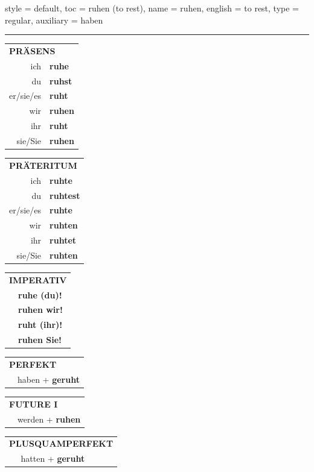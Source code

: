 \begin{verbentry}{
  style = {default},
  toc = {ruhen (to rest)},
  name = {ruhen},
  english = {to rest},
  type = {regular},
  auxiliary = {haben}
}
 

\vspace{5pt}
\hrule
\vspace{5pt}

\begin{tabular}{rl}
\multicolumn{2}{l}{\textbf{PRÄSENS}}\\
ich & \textbf{ruhe}\\
du & \textbf{ruhst}\\
er/sie/es & \textbf{ruht}\\
wir & \textbf{ruhen}\\
ihr & \textbf{ruht}\\
sie/Sie & \textbf{ruhen}\\
\end{tabular}
\hfill
\begin{tabular}{rl}
\multicolumn{2}{l}{\textbf{PRÄTERITUM}}\\
ich & \textbf{ruhte}\\
du & \textbf{ruhtest}\\
er/sie/es & \textbf{ruhte}\\
wir & \textbf{ruhten}\\
ihr & \textbf{ruhtet}\\
sie/Sie & \textbf{ruhten}\\
\end{tabular}
\hfill
\begin{tabular}{rl}
\multicolumn{2}{l}{\textbf{IMPERATIV}}\\
& \textbf{ruhe (du)!}\\
& \textbf{ruhen wir!}\\
& \textbf{ruht (ihr)!}\\
& \textbf{ruhen Sie!}\\
\end{tabular}

\vspace{10pt}

\begin{tabular}{rl}
\multicolumn{2}{l}{\textbf{PERFEKT}}\\
& haben + \textbf{geruht}\\
\end{tabular}
\hfill
\begin{tabular}{rl}
\multicolumn{2}{l}{\textbf{FUTURE I}}\\
& werden + \textbf{ruhen}\\
\end{tabular}
\hfill
\begin{tabular}{rl}
\multicolumn{2}{l}{\textbf{PLUSQUAMPERFEKT}}\\
& hatten + \textbf{geruht}\\
\end{tabular}


\end{verbentry}
